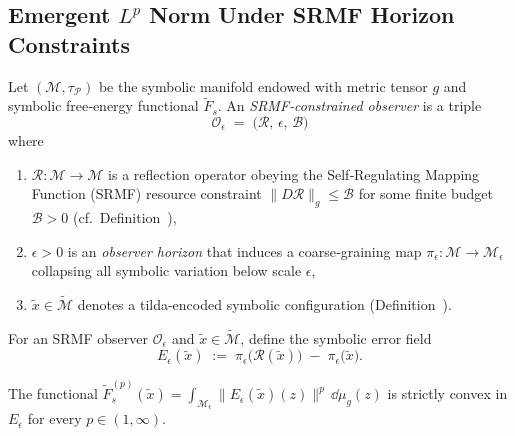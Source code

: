 \subsection[\texorpdfstring{Emergent $L^p$ Norm Under SRMF Horizon Constraints}{Emergent Lp Norm Under SRMF Horizon Constraints}]
{\texorpdfstring{Emergent $L^p$ Norm Under SRMF Horizon Constraints}
{Emergent Lp Norm Under SRMF Horizon Constraints}}
\label{subsec:bk7_emergent_lp_norm_under_srmf_horizon_constrain}
\begin{definition}
\label{definition:bk7_srmfconstrained_observer}
Let $(\mathcal{M},\tau_{\mathcal{P}})$ be the symbolic manifold endowed with
metric tensor $g$ and symbolic free‑energy functional $\tilde{F}_s$.
An \emph{SRMF‐constrained observer} is a triple
\[
\mathcal{O}_{\epsilon} \;=\; \bigl( \mathcal{R},\, \epsilon,\, \mathcal{B} \bigr)
\]
where
\begin{enumerate}[label=(\roman*)]
  \item $\mathcal{R}\colon\mathcal{M}\!\to\!\mathcal{M}$ is a reflection operator
        obeying the Self‑Regulating Mapping Function (SRMF) resource constraint
        \(\lVert D\mathcal{R}\rVert_g \le \mathcal{B}\) for some finite budget
        $\mathcal{B}>0$ (cf.\ Definition~),
  \item \(\epsilon > 0\) is an \emph{observer horizon} that induces a
        coarse‑graining map
        \(
        \pi_{\epsilon}\colon \mathcal{M}\!\to\!\mathcal{M}_{\epsilon}
        \)
        collapsing all symbolic variation below scale $\epsilon$,
  \item $\tilde{x}\in\tilde{\mathcal{M}}$ denotes a
        tilda‑encoded symbolic configuration
        (Definition~).
\end{enumerate}
\end{definition}
\begin{definition}
\label{definition:bk7_observerrelative_symbolic_error_field}
For an SRMF observer $\mathcal{O}_{\epsilon}$ and
$\tilde{x}\in\tilde{\mathcal{M}}$, define the symbolic
error field
\[
E_{\epsilon}(\tilde{x}) \;:=\;
\pi_{\epsilon}\bigl(\mathcal{R}(\tilde{x})\bigr)
\;-\;
\pi_{\epsilon}\bigl(\tilde{x}\bigr).
\]
\end{definition}
\begin{lemma}
\label{lemma:bk7_coarsegrained_convexity}
The functional
\(
\tilde{F}_{s}^{(p)}(\tilde{x})
=\!\displaystyle \int_{\mathcal{M}_{\epsilon}}
\bigl\lVert E_{\epsilon}(\tilde{x})(z)\bigr\rVert^{p}\,
\dd\mu_{g}(z)
\)
is strictly convex in $E_{\epsilon}$ for every $p\!\in\!(1,\infty)$.
\end{lemma}
